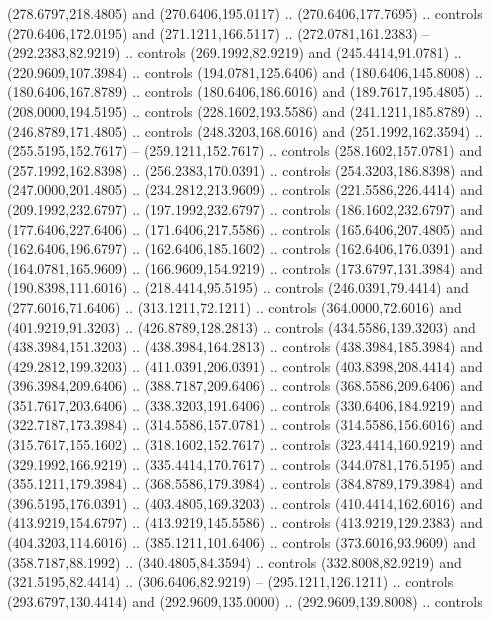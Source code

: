 {{\begin{scope}[y=-0.80pt,x=0.80pt,scale=0.038,xshift=-635pt,yshift=334pt]
        (278.6797,218.4805) and (270.6406,195.0117) .. (270.6406,177.7695) .. controls
        (270.6406,172.0195) and (271.1211,166.5117) .. (272.0781,161.2383) --
        (292.2383,82.9219) .. controls (269.1992,82.9219) and (245.4414,91.0781) ..
        (220.9609,107.3984) .. controls (194.0781,125.6406) and (180.6406,145.8008) ..
        (180.6406,167.8789) .. controls (180.6406,186.6016) and (189.7617,195.4805) ..
        (208.0000,194.5195) .. controls (228.1602,193.5586) and (241.1211,185.8789) ..
        (246.8789,171.4805) .. controls (248.3203,168.6016) and (251.1992,162.3594) ..
        (255.5195,152.7617) -- (259.1211,152.7617) .. controls (258.1602,157.0781) and
        (257.1992,162.8398) .. (256.2383,170.0391) .. controls (254.3203,186.8398) and
        (247.0000,201.4805) .. (234.2812,213.9609) .. controls (221.5586,226.4414) and
        (209.1992,232.6797) .. (197.1992,232.6797) .. controls (186.1602,232.6797) and
        (177.6406,227.6406) .. (171.6406,217.5586) .. controls (165.6406,207.4805) and
        (162.6406,196.6797) .. (162.6406,185.1602) .. controls (162.6406,176.0391) and
        (164.0781,165.9609) .. (166.9609,154.9219) .. controls (173.6797,131.3984) and
        (190.8398,111.6016) .. (218.4414,95.5195) .. controls (246.0391,79.4414) and
        (277.6016,71.6406) .. (313.1211,72.1211) .. controls (364.0000,72.6016) and
        (401.9219,91.3203) .. (426.8789,128.2813) .. controls (434.5586,139.3203) and
        (438.3984,151.3203) .. (438.3984,164.2813) .. controls (438.3984,185.3984) and
        (429.2812,199.3203) .. (411.0391,206.0391) .. controls (403.8398,208.4414) and
        (396.3984,209.6406) .. (388.7187,209.6406) .. controls (368.5586,209.6406) and
        (351.7617,203.6406) .. (338.3203,191.6406) .. controls (330.6406,184.9219) and
        (322.7187,173.3984) .. (314.5586,157.0781) .. controls (314.5586,156.6016) and
        (315.7617,155.1602) .. (318.1602,152.7617) .. controls (323.4414,160.9219) and
        (329.1992,166.9219) .. (335.4414,170.7617) .. controls (344.0781,176.5195) and
        (355.1211,179.3984) .. (368.5586,179.3984) .. controls (384.8789,179.3984) and
        (396.5195,176.0391) .. (403.4805,169.3203) .. controls (410.4414,162.6016) and
        (413.9219,154.6797) .. (413.9219,145.5586) .. controls (413.9219,129.2383) and
        (404.3203,114.6016) .. (385.1211,101.6406) .. controls (373.6016,93.9609) and
        (358.7187,88.1992) .. (340.4805,84.3594) .. controls (332.8008,82.9219) and
        (321.5195,82.4414) .. (306.6406,82.9219) -- (295.1211,126.1211) .. controls
        (293.6797,130.4414) and (292.9609,135.0000) .. (292.9609,139.8008) .. controls

\end{scope}}}
